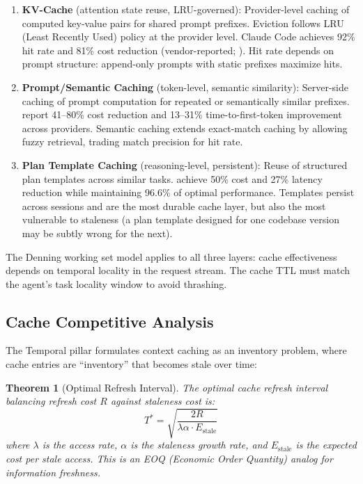 \documentclass[11pt, a4paper, logo, copyright]{googledeepmind}
\newtheorem{theorem}{Theorem}[section]
\begin{document}
\begin{enumerate}
    \item \textbf{KV-Cache} (attention state reuse, LRU-governed): Provider-level caching of computed key-value pairs for shared prompt prefixes. Eviction follows LRU (Least Recently Used) policy at the provider level. Claude Code achieves 92\% hit rate and 81\% cost reduction (vendor-reported; \citealt{anthropic2026agentic}). Hit rate depends on prompt structure: append-only prompts with static prefixes maximize hits.

    \item \textbf{Prompt/Semantic Caching} (token-level, semantic similarity): Server-side caching of prompt computation for repeated or semantically similar prefixes. \citet{liang2026cache} report 41--80\% cost reduction and 13--31\% time-to-first-token improvement across providers. Semantic caching extends exact-match caching by allowing fuzzy retrieval, trading match precision for hit rate.

    \item \textbf{Plan Template Caching} (reasoning-level, persistent): Reuse of structured plan templates across similar tasks. \citet{zhang2025apc} achieve 50\% cost and 27\% latency reduction while maintaining 96.6\% of optimal performance. Templates persist across sessions and are the most durable cache layer, but also the most vulnerable to staleness (a plan template designed for one codebase version may be subtly wrong for the next).
\end{enumerate}

The Denning working set model \citep{denning1968working} applies to all three layers: cache effectiveness depends on temporal locality in the request stream. The cache TTL must match the agent's task locality window to avoid thrashing.

\subsection{Cache Competitive Analysis}

The Temporal pillar formulates context caching as an inventory problem, where cache entries are ``inventory'' that becomes stale over time:

\begin{theorem}[Optimal Refresh Interval]
\label{thm:cache-eoq}
The optimal cache refresh interval balancing refresh cost $R$ against staleness cost is:
\begin{equation}
    T^* = \sqrt{\frac{2R}{\lambda \alpha \cdot E_{\text{stale}}}}
\end{equation}
where $\lambda$ is the access rate, $\alpha$ is the staleness growth rate, and $E_{\text{stale}}$ is the expected cost per stale access. This is an EOQ (Economic Order Quantity) analog for information freshness.
\end{theorem}
\end{document}
